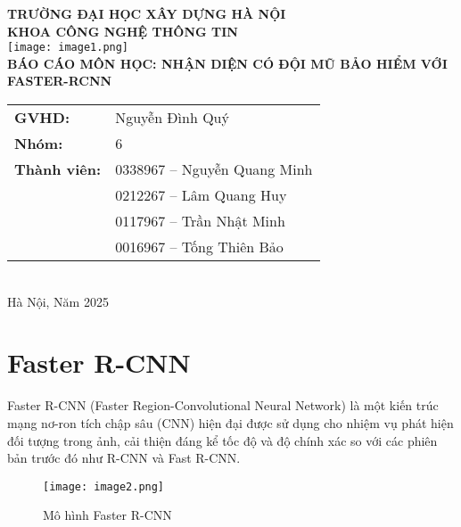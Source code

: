 \documentclass{article}
\begin{document}
\begin{center}
    \textbf{TRƯỜNG ĐẠI HỌC XÂY DỰNG HÀ NỘI} \\
    \vspace{0.5cm}
    \textbf{KHOA CÔNG NGHỆ THÔNG TIN} \\
    \vspace{0.5cm}
    \texttt{[image: image1.png]} \\
    \vspace{0.5cm}
    \textbf{BÁO CÁO MÔN HỌC: NHẬN DIỆN CÓ ĐỘI MŨ BẢO HIỂM VỚI FASTER-RCNN} \\
    \vspace{1cm}
    \begin{tabular}{ll}
        \textbf{GVHD:} & Nguyễn Đình Quý \\
        \textbf{Nhóm:} & 6 \\
        \textbf{Thành viên:} & 0338967 – Nguyễn Quang Minh \\
        & 0212267 – Lâm Quang Huy \\
        & 0117967 – Trần Nhật Minh \\
        & 0016967 – Tống Thiên Bảo \\
    \end{tabular} \\
    \vspace{1cm}
    Hà Nội, Năm 2025
\end{center}

\newpage

\tableofcontents
\newpage

\section{Faster R-CNN}
Faster R-CNN (Faster Region-Convolutional Neural Network) là một kiến trúc mạng nơ-ron tích chập sâu (CNN) hiện đại được sử dụng cho nhiệm vụ phát hiện đối tượng trong ảnh, cải thiện đáng kể tốc độ và độ chính xác so với các phiên bản trước đó như R-CNN và Fast R-CNN.

\begin{figure}[H]
    \centering
    \texttt{[image: image2.png]}
    \caption{Mô hình Faster R-CNN}
\end{figure}
\end{document}
